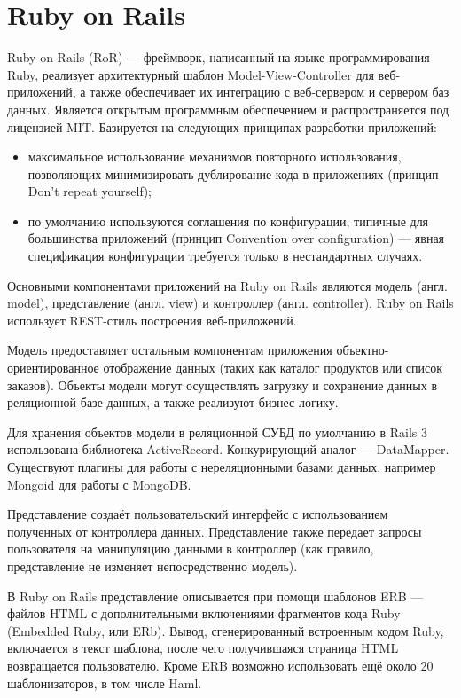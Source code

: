 \section{Ruby on Rails}\label{sec:ch3/sect2}
Ruby on Rails (RoR) — фреймворк, написанный на языке программирования Ruby, реализует архитектурный шаблон Model-View-Controller для веб-приложений, а также обеспечивает их интеграцию с веб-сервером и сервером баз данных. Является открытым программным обеспечением и распространяется под лицензией MIT.
Базируется на следующих принципах разработки приложений:
\begin{itemize}
  \item максимальное использование механизмов повторного использования, позволяющих минимизировать дублирование кода в приложениях (принцип Don’t repeat yourself);
  \item по умолчанию используются соглашения по конфигурации, типичные для большинства приложений (принцип Convention over configuration) — явная спецификация конфигурации требуется только в нестандартных случаях.
\end{itemize}

Основными компонентами приложений на Ruby on Rails являются модель (англ. model), представление (англ. view) и контроллер (англ. controller). Ruby on Rails использует REST-стиль построения веб-приложений.

Модель предоставляет остальным компонентам приложения объектно-ориентированное отображение данных (таких как каталог продуктов или список заказов). Объекты модели могут осуществлять загрузку и сохранение данных в реляционной базе данных, а также реализуют бизнес-логику.

Для хранения объектов модели в реляционной СУБД по умолчанию в Rails 3 использована библиотека ActiveRecord. Конкурирующий аналог — DataMapper. Существуют плагины для работы с нереляционными базами данных, например Mongoid для работы с MongoDB.

Представление создаёт пользовательский интерфейс с использованием полученных от контроллера данных. Представление также передает запросы пользователя на манипуляцию данными в контроллер (как правило, представление не изменяет непосредственно модель).

В Ruby on Rails представление описывается при помощи шаблонов ERB — файлов HTML с дополнительными включениями фрагментов кода Ruby (Embedded Ruby, или ERb). Вывод, сгенерированный встроенным кодом Ruby, включается в текст шаблона, после чего получившаяся страница HTML возвращается пользователю. Кроме ERB возможно использовать ещё около 20 шаблонизаторов, в том числе Haml.

